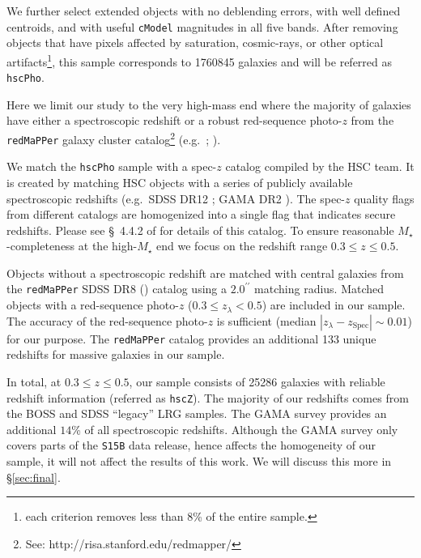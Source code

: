 \documentclass[a4paper,fleqn,usenatbib]{mnras}
\def\arcsec{{\prime\prime}}
\def\redm{\texttt{redMaPPer}}
\def\mstar{{$M_{\star}$}}
\begin{document}
    We further select extended objects with no deblending errors, with well defined 
    centroids, and with useful \texttt{cModel} magnitudes in all five bands. 
    After removing objects that have pixels affected by saturation, cosmic-rays, or 
    other optical artifacts\footnote{each criterion removes less than 8\% of the 
    entire sample.}, this sample corresponds to 1760845 galaxies and will be referred 
    as \texttt{hscPho}. 
        
    Here we limit our study to the very high-mass end where the majority of galaxies 
    have either a spectroscopic redshift or a robust red-sequence photo-$z$ from the 
    \redm{} galaxy cluster catalog\footnote{See: http://risa.stanford.edu/redmapper/} 
    (e.g.\ \citealt{Rykoff2014}; \citealt{Rozo2015b}).  

    We match the \texttt{hscPho} sample with a spec-$z$ catalog compiled by the HSC 
    team.
    It is created by matching HSC objects with a series of publicly available 
    spectroscopic redshifts (e.g.\ SDSS DR12 \citealt{SDSSDR12}; 
    GAMA DR2 \citealt{Liske2015}). 
    The spec-$z$ quality flags from different catalogs are homogenized into a single 
    flag that indicates secure redshifts.
    Please see \S~4.4.2 of \citet{HSC_DR1} for details of this catalog.  
    To ensure reasonable \mstar{}-completeness at the high-\mstar{} end we focus on
    the redshift range $0.3 \leq z \leq 0.5$. 
   
    Objects without a spectroscopic redshift are matched with central 
    galaxies from the \redm{} SDSS DR8 (\citealt{Rykoff2014}) catalog using a 
    $2.0^{\arcsec}$ matching radius. 
    Matched objects with a red-sequence photo-$z$ ($0.3 \leq z_{\lambda} < 0.5$) are 
    included in our sample. 
    The accuracy of the red-sequence photo-$z$ is sufficient (median 
    $|z_{\lambda} - z_{\mathrm{Spec}}| {\sim} 0.01$) for our purpose.
    The \redm{} catalog provides an additional 133 unique redshifts for massive 
    galaxies in our sample.
        
    In total, at $0.3 \leq z \leq 0.5$, our sample consists of 25286 galaxies with 
    reliable redshift information (referred as \texttt{hscZ}).
    The majority of our redshifts comes from the BOSS and SDSS ``legacy'' LRG samples. 
    The GAMA survey provides an additional $14$\% of all spectroscopic redshifts.
    Although the GAMA survey only covers parts of the \texttt{S15B} data release, 
    hence affects the homogeneity of our sample, it will not affect the results of 
    this work.
    We will discuss this more in \S \ref{sec:final}.
\end{document}
